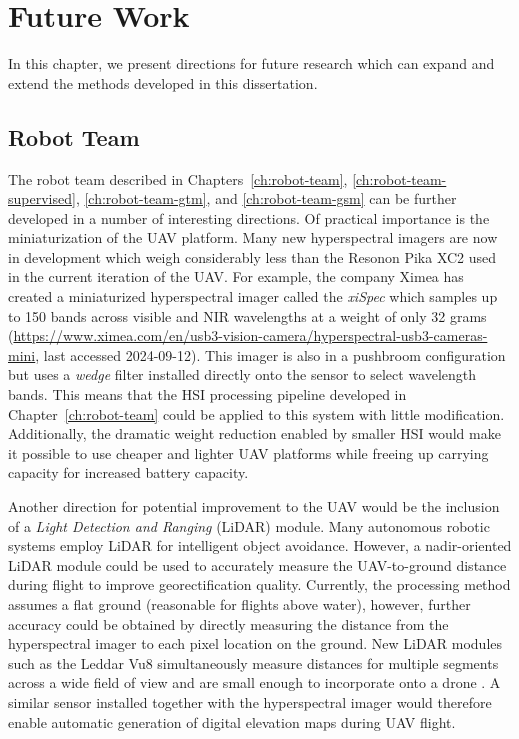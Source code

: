 \chapter{Future Work}\label{ch:future-work}

In this chapter, we present directions for future research which can expand and
extend the methods developed in this dissertation.

\section{Robot Team}

The robot team described in Chapters~\ref{ch:robot-team},
\ref{ch:robot-team-supervised}, \ref{ch:robot-team-gtm}, and
\ref{ch:robot-team-gsm} can be further developed in a number of interesting
directions. Of practical importance is the miniaturization of the UAV platform.
Many new hyperspectral imagers are now in development which weigh considerably less
than the Resonon Pika XC2 used in the current iteration of the UAV. For example, the
company Ximea has created a miniaturized hyperspectral imager called the \textit{xiSpec}
which samples up to 150 bands across visible and NIR wavelengths at a weight of
only 32 grams
(\url{https://www.ximea.com/en/usb3-vision-camera/hyperspectral-usb3-cameras-mini},
last accessed 2024-09-12). This imager is also in a pushbroom configuration but uses a
\textit{wedge} filter installed directly onto the sensor to select wavelength
bands. This means that the HSI processing pipeline developed in
Chapter~\ref{ch:robot-team} could be applied to this system with little
modification. Additionally, the dramatic weight reduction enabled by smaller HSI
would make it possible to use cheaper and lighter UAV platforms while freeing up
carrying capacity for increased battery capacity.

Another direction for potential improvement to the UAV would be the inclusion of
a \textit{Light Detection and Ranging} (LiDAR) module. Many autonomous robotic
systems employ LiDAR for intelligent object avoidance. However, a nadir-oriented
LiDAR module could be used to accurately measure the UAV-to-ground distance
during flight to improve georectification quality. Currently, the processing
method assumes a flat ground (reasonable for flights above water), however,
further accuracy could be obtained by directly measuring the distance from the
hyperspectral imager to each pixel location on the ground. New LiDAR modules
such as the Leddar Vu8 simultaneously measure distances for multiple
segments across a wide field of view and are small enough to incorporate onto a
drone \cite{marin2021study}. A similar sensor installed together with the
hyperspectral imager would therefore enable automatic generation of digital
elevation maps during UAV flight.


